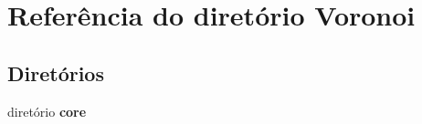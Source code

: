 \section{Referência do diretório Voronoi}
\label{dir_c03812260ea4b9a18346522ef735c3cf}
\subsection*{Diretórios}
\begin{DoxyCompactItemize}
\item 
diretório {\bf core}
\end{DoxyCompactItemize}
